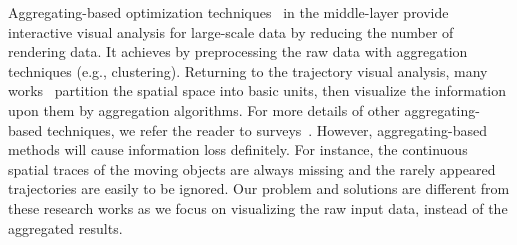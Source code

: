 Aggregating-based optimization techniques~\cite{zeng2013visualizing,von2015mobilitygraphs} in the middle-layer provide interactive visual analysis for large-scale data by
reducing the number of rendering data.
It achieves by preprocessing the raw data with aggregation techniques (e.g., clustering).
Returning to the trajectory visual analysis, 
many works~\cite{wood2010visualisation,guo2009flow,von2015mobilitygraphs} partition the spatial space into basic units,
then visualize the information upon them by aggregation algorithms.
For more details of other aggregating-based techniques, we refer the reader to surveys~\cite{xxx}.
However, aggregating-based methods will cause information loss definitely. 
For instance, the continuous spatial traces of the moving objects are always missing and the rarely appeared trajectories are easily to be ignored.
Our problem and solutions are different from these research works as we focus on visualizing the raw input data, instead of the aggregated results.


